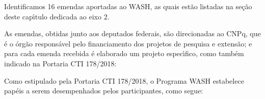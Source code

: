 \documentclass[
12pt,		%
openright,	%
twoside,  %
a4paper,			%
chapter=TITLE,		%
english,			%
french,				%
spanish,			%
brazil				%
]{USPSC-classe/USPSC}
\begin{document}
Identificamos 16 emendas aportadas ao WASH, as quais est\~ao listadas na se\c{c}\~ao deste cap\'{\i}tulo dedicada ao eixo 2.









As emendas, obtidas junto aos deputados federais, s\~ao direcionadas ao CNPq, que \'e o \'org\~ao respons\'avel pelo financiamento dos projetos de pesquisa e extens\~ao; e para cada emenda recebida \'e elaborado um projeto espec\'{\i}fico, como tamb\'em indicado na Portaria CTI 178/2018:










\noindent\begin{center}\mbox{\centering{}}\end{center}


Como estipulado pela Portaria CTI 178/2018, o Programa WASH estabelece pap\'eis a serem desempenhados pelos participantes, como segue:
\end{document}
